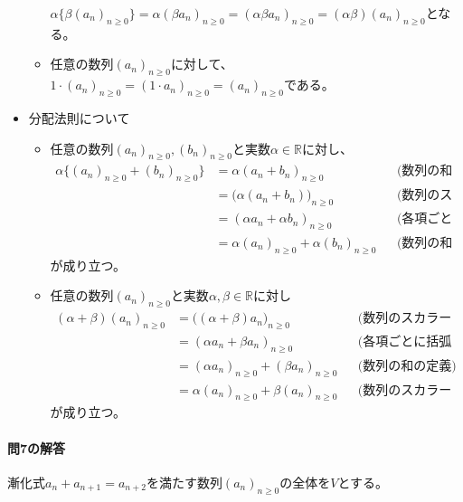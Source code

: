 \begin{itemize}
\begin{itemize}
$\alpha\bigl\{\beta(a_n)_{n \geq 0}\bigr\} = \alpha (\beta a_n)_{n \geq 0} = (\alpha \beta a_n)_{n \geq 0} = (\alpha \beta)(a_n)_{n \geq 0}$となる。
\item 任意の数列$(a_n)_{n \geq 0}$に対して、$1\cdot (a_n)_{n \geq 0} = (1\cdot a_n)_{n \geq 0} = (a_n)_{n \geq 0}$である。
\end{itemize}
\item 分配法則について
\begin{itemize}
\item 任意の数列$(a_n)_{n \geq 0}, (b_n)_{n \geq 0}$と実数$\alpha \in \mathbb{R}$に対し、
\begin{align*}
\alpha\bigl\{(a_n)_{n \geq 0} + (b_n)_{n \geq 0}\bigr\} 
&= \alpha (a_n+ b_n)_{n \geq 0} & & \text{(数列の和の定義)} \\
&= \bigl(\alpha(a_n + b_n)\bigr)_{n \geq 0} & & \text{(数列のスカラー倍の定義)} \\
&= (\alpha a_n + \alpha b_n)_{n \geq 0} & & \text{(各項ごとに括弧を展開)} \\
&= \alpha (a_n)_{n \geq 0} + \alpha (b_n)_{n \geq 0} & & \text{(数列の和の定義)}
\end{align*}
が成り立つ。
\item 任意の数列$(a_n)_{n \geq 0}$と実数$\alpha, \beta\in\mathbb{R}$に対し
\begin{align*}
(\alpha + \beta) (a_n)_{n \geq 0}
&= \bigl( (\alpha + \beta) a_n\bigr)_{n \geq 0} & & \text{(数列のスカラー倍の定義)} \\
&= (\alpha a_n + \beta a_n)_{n \geq 0} & & \text{(各項ごとに括弧を展開)} \\
&= (\alpha a_n)_{n \geq 0} + (\beta a_n)_{n \geq 0} & & \text{(数列の和の定義)} \\
&= \alpha (a_n)_{n \geq 0} + \beta (a_n)_{n \geq 0} & & \text{(数列のスカラー倍の定義)}
\end{align*}
が成り立つ。
\end{itemize}
\end{itemize}

\paragraph{問7の解答}
漸化式$a_n + a_{n+1} = a_{n+2}$を満たす数列$(a_n)_{n\geq 0}$の全体を$V$とする。

